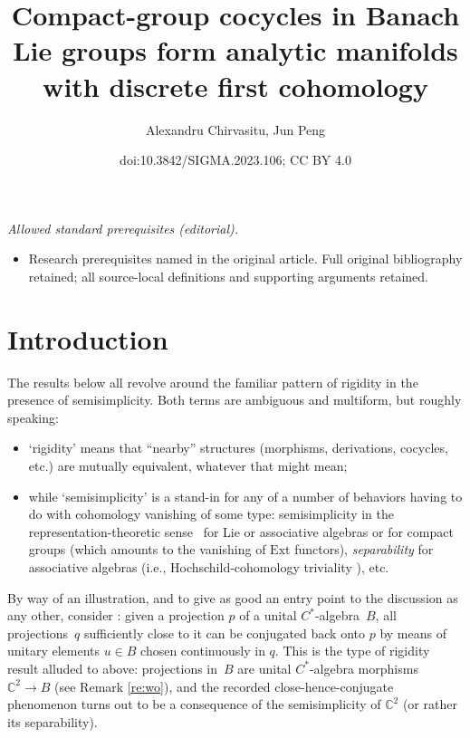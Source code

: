 \documentclass[10pt,a4paper]{amsart}
\title{Compact-group cocycles in Banach Lie groups form analytic manifolds with discrete first cohomology}
\author{Alexandru Chirvasitu, Jun Peng}
\date{doi:10.3842/SIGMA.2023.106; CC BY 4.0}
\numberwithin{equation}{section}
\newcommand\bC{{\mathbb C}}
\begin{document}
\maketitle
\noindent\textit{Allowed standard prerequisites (editorial).}\begin{itemize}
\item Research prerequisites named in the original article. Full original bibliography retained; all source-local definitions and supporting arguments retained.
\end{itemize}\medskip
\section{Introduction}

The results below all revolve around the familiar pattern of rigidity in the presence of semisimplicity. Both terms are ambiguous and multiform, but roughly speaking:
\begin{itemize}\itemsep=0pt
\item `rigidity' means that ``nearby'' structures (morphisms, derivations, cocycles, etc.) are mutually equivalent, whatever that might mean;
\item while `semisimplicity' is a stand-in for any of a number of behaviors having to do with cohomology vanishing of some type: semisimplicity in the representation-theoretic sense~\cite[Definition~2.1]{lam} for Lie or associative algebras or for compact groups (which amounts to the vanishing of $\mathrm{Ext}$ functors), {\it separability} \cite[Section~10.2, Definition]{pierce} for associative algebras (i.e., Hochschild-cohomology triviality \cite[Section~11.5, Proposition]{pierce}), etc.
\end{itemize}

By way of an illustration, and to give as good an entry point to the discussion as any other, consider \cite[Proposition 5.2.6]{wo}: given a projection $p$ of a unital $C^*$-algebra~$B$, all projections~$q$ sufficiently close to it can be conjugated back onto $p$ by means of unitary elements $u\in B$ chosen continuously in $q$. This is the type of rigidity result alluded to above: projections in~$B$ are unital $C^*$-algebra morphisms $\bC^2\to B$ (see Remark \ref{re:wo}), and the recorded close-hence-conjugate phenomenon turns out to be a consequence of the semisimplicity of $\bC^2$ (or rather its separability).
\end{document}
